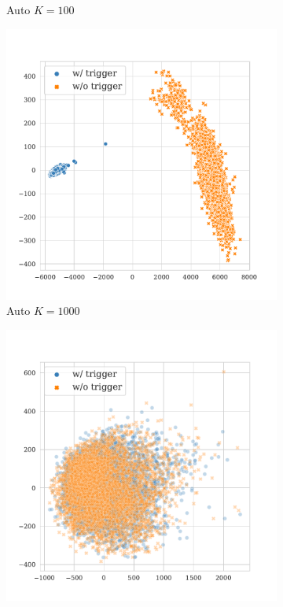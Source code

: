 \begin{figure}[!ht]
\begin{subfigure}{.33\textwidth}
  \caption{Auto $K = 100$}
  \label{fig:mnli_matched_auto_k100_embed}
\end{subfigure}
\begin{subfigure}{.33\textwidth}
  \centering
  \includegraphics[width=\linewidth]{figures/evaluation_media/mnli-matched-roberta-large-visual-backdoor-auto-k1000-seed42-candidates10-poison-cf-1555.pdf}
  \caption{Auto $K = 1000$}
  \label{fig:mnli_matched_auto_k1000_embed}
\end{subfigure}
\begin{subfigure}{.33\textwidth}
  \centering
  \includegraphics[width=\linewidth]{figures/evaluation_media/mnli-matched-roberta-large-visual-backdoor-diff-prompt-k16-seed42-poison-cf-1713.pdf}

\end{subfigure}
\end{figure}
